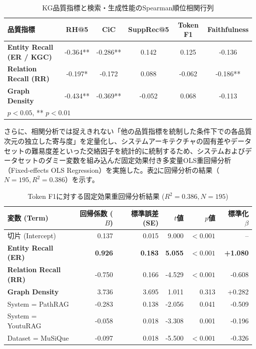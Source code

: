 \documentclass[a4j,dvipdfmx]{jsarticle}
\begin{document}
\begin{table}[t]
\centering
\caption{KG品質指標と検索・生成性能のSpearman順位相関行列}
\label{tab:spearman_corr}
\small
\begin{tabular}{l|ccccc}
\hline
\textbf{品質指標} & \textbf{RH@5} & \textbf{CiC} & \textbf{SuppRec@5} & \textbf{Token F1} & \textbf{Faithfulness} \\
\hline
\textbf{Entity Recall (ER / KGC)} & -0.364** & -0.286** & 0.142 & 0.125 & -0.136 \\
\textbf{Relation Recall (RR)} & -0.197* & -0.172 & 0.088 & -0.062 & -0.186** \\
\textbf{Graph Density} & -0.434** & -0.369** & -0.052 & 0.068 & -0.113 \\
\hline
\multicolumn{6}{l}{\footnotesize * $p < 0.05$, ** $p < 0.01$}
\end{tabular}
\end{table}

さらに、相関分析では捉えきれない「他の品質指標を統制した条件下での各品質次元の独立した寄与度」を定量化し、システムアーキテクチャの固有差やデータセットの難易度差といった交絡因子を統計的に統制するため、システムおよびデータセットのダミー変数を組み込んだ固定効果付き多変量OLS重回帰分析（Fixed-effects OLS Regression）を実施した。表\ref{tab:regression_results}に回帰分析の結果（$N=195, R^2 = 0.386$）を示す。

\begin{table}[t]
\centering
\caption{Token F1に対する固定効果重回帰分析結果 ($R^2 = 0.386, N=195$)}
\label{tab:regression_results}
\small
\begin{tabular}{l|rrrrr}
\hline
\textbf{変数 (Term)} & \textbf{回帰係数 ($B$)} & \textbf{標準誤差 (SE)} & \textbf{$t$値} & \textbf{$p$値} & \textbf{標準化 $\beta$} \\
\hline
切片 (Intercept) & 0.137 & 0.015 & 9.000 & $<0.001$ & -- \\
\textbf{Entity Recall (ER)} & \textbf{0.926} & \textbf{0.183} & \textbf{5.055} & \textbf{$<0.001$} & \textbf{+1.080} \\
\textbf{Relation Recall (RR)} & -0.750 & 0.166 & -4.529 & $<0.001$ & -0.608 \\
\textbf{Graph Density} & 3.736 & 3.695 & 1.011 & 0.313 & +0.282 \\
System = PathRAG & -0.283 & 0.138 & -2.056 & 0.041 & -0.509 \\
System = YoutuRAG & -0.058 & 0.018 & -3.308 & 0.001 & -0.196 \\
Dataset = MuSiQue & -0.097 & 0.018 & -5.500 & $<0.001$ & -0.326 \\
\hline
\end{tabular}
\end{table}
\end{document}
